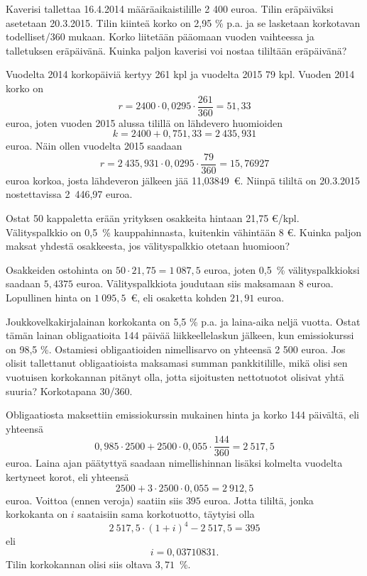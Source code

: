 \documentclass{article}\usepackage[]{graphicx}\usepackage[]{color}
\begin{document}
\begin{question} 
    Kaverisi tallettaa 16.4.2014 määräaikaistilille 2 400 euroa. Tilin eräpäiväksi asetetaan 20.3.2015. Tilin kiinteä korko on 2{,}95 \% p.a. ja se lasketaan korkotavan todelliset/360 mukaan. Korko liitetään pääomaan vuoden vaihteessa ja talletuksen eräpäivänä. Kuinka paljon kaverisi voi nostaa tililtään eräpäivänä?
\end{question}
\begin{solution}
    Vuodelta 2014 korkopäiviä kertyy 261 kpl ja vuodelta 2015 79 kpl. Vuoden 2014 korko on
    \[
        r = 2400\cdot 0,0295\cdot \frac{261}{360} = 51{,}33
    \]
    euroa, joten vuoden 2015 alussa tilillä on lähdevero huomioiden 
    \[
        k = 2400 + 0,751{,}33 = 2~435{,}931
    \]
    euroa. Näin ollen vuodelta 2015 saadaan
    \[
        r = 2~435{,}931\cdot0,0295\cdot\frac{79}{360} = 15{,}76927
    \]
    euroa korkoa, josta lähdeveron jälkeen jää 11{,}03849\ \euro. Niinpä tililtä on 20.3.2015 nostettavissa 2~446{,}97 euroa.
\end{solution}

\begin{question} 
    Ostat 50 kappaletta erään yrityksen osakkeita hintaan 21{,}75 \euro/kpl. Välityspalkkio on 0{,}5~\% kauppahinnasta, kuitenkin vähintään 8 \euro. Kuinka paljon maksat yhdestä osakkeesta, jos välityspalkkio otetaan huomioon?
\end{question}
\begin{solution}
    Osakkeiden ostohinta on \(50\cdot21,75 = 1~087{,}5\) euroa, joten 0,5~\% välityspalkkioksi saadaan \(5{,}4375\) euroa. Välityspalkkiota joudutaan siis maksamaan 8 euroa. Lopullinen hinta on \(1~095{,}5\)~\euro, eli osaketta kohden \(21{,}91\) euroa.
\end{solution}

\begin{question} 
    Joukkovelkakirjalainan korkokanta on 5{,}5 \% p.a. ja laina-aika neljä vuotta. Ostat tämän lainan obligaatioita 144 päivää liikkeellelaskun jälkeen, kun emissiokurssi on 98{,}5 \%. Ostamiesi obligaatioiden nimellisarvo on yhteensä 2 500 euroa. Jos olisit tallettanut obligaatioista maksamasi summan pankkitilille, mikä olisi sen vuotuisen korkokannan pitänyt olla, jotta sijoitusten nettotuotot olisivat yhtä suuria? Korkotapana 30/360.
\end{question}
\begin{solution}
    Obligaatiosta maksettiin emissiokurssin mukainen hinta ja korko 144 päivältä, eli yhteensä 
    \[
        0,985\cdot2500 + 2500\cdot0,055\cdot\frac{144}{360} = 2~517{,}5
    \]
    euroa. Laina ajan päätyttyä saadaan nimellishinnan lisäksi kolmelta vuodelta kertyneet korot, eli yhteensä
    \[
       2500 + 3\cdot 2500 \cdot 0,055 = 2~912{,}5
    \]
    euroa. Voittoa (ennen veroja) saatiin siis \(395\) euroa. Jotta tililtä, jonka korkokanta on \(i\) saataisiin sama korkotuotto, täytyisi olla
    \[
        2~517{,}5\cdot (1+i)^4 - 2~517{,}5 = 395
    \]
    eli
    \[
        i = 0{,}03710831.
    \]
    Tilin korkokannan olisi siis oltava \(3{,}71\)~\%.
\end{solution}
\end{document}

